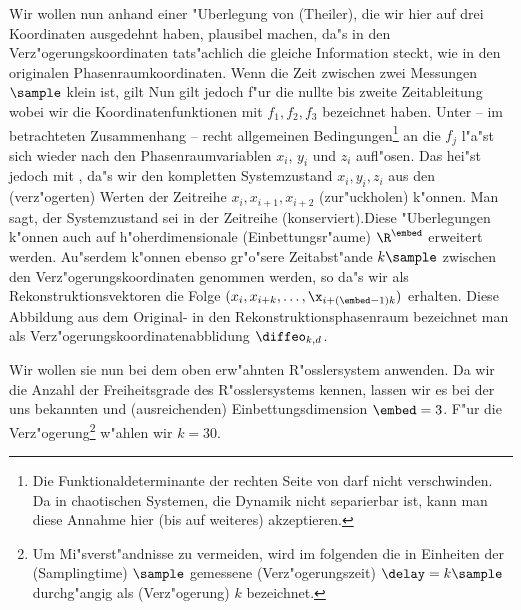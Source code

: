 Wir wollen nun anhand einer "Uberlegung von \autor(Theiler), die wir hier auf drei
Koordinaten ausgedehnt haben, plausibel machen, da"s in den Verz"ogerungskoordinaten
tats"achlich die gleiche Information steckt, wie in den originalen Phasenraumkoordinaten.
Wenn die Zeit zwischen zwei Messungen $\sample$ klein ist, gilt 
Nun gilt jedoch f"ur die nullte bis zweite Zeitableitung
wobei wir die Koordinatenfunktionen mit $f_1,f_2,f_3$ bezeichnet haben. Unter -- im
betrachteten Zusammenhang -- recht allgemeinen Bedingungen\footnote{Die
Funktionaldeterminante der rechten Seite von  darf nicht verschwinden. Da
in chaotischen Systemen, die Dynamik nicht separierbar ist, kann man diese Annahme hier
(bis auf weiteres) akzeptieren.} an die $f_j$ l"a"st sich  wieder
nach den Phasenraumvariablen $x_i$, $y_i$ und $z_i$ aufl"osen. Das hei"st jedoch mit
, da"s wir den kompletten Systemzustand $x_i,y_i,z_i$ aus den
\begriff(verz"ogerten) Werten der Zeitreihe $x_{i},x_{i+1},x_{i+2}$
\metapher(zur"uckholen) k"onnen. Man sagt, der Systemzustand sei in der Zeitreihe
\metapher(konserviert).Diese  "Uberlegungen k"onnen auch auf h"oherdimensionale
\begriff(Einbettungsr"aume) $\R^\embed$  erweitert werden. Au"serdem k"onnen ebenso
gr"o"sere Zeitabst"ande $k\sample$ zwischen den Verz"ogerungskoordinaten genommen werden,
so da"s wir als Rekonstruktionsvektoren die Folge $(x_{i},
x_{i+k},\dots,\x_{i+(\embed-1)k})$ erhalten. Diese Abbildung aus dem Original- in 
den Rekonstruktionsphasenraum bezeichnet man als Verz"ogerungskoordinatenabblidung $\diffeo_{k,d}$.

Wir wollen sie nun bei dem oben erw"ahnten R"osslersystem anwenden.
Da wir die Anzahl der Freiheitsgrade des R"osslersystems kennen, lassen wir es bei der uns
bekannten und \naja(ausreichenden) Einbettungsdimension $\embed=3$. F"ur die Verz"ogerung\footnote{Um Mi"sverst"andnisse
zu vermeiden, wird im folgenden die in Einheiten der \begriff(Samplingtime) $\sample$ gemessene 
\begriff(Verz"ogerungszeit) $\delay=k\sample$ durchg"angig als \begriff(Verz"ogerung) $k$
bezeichnet.} w"ahlen wir $k=30$. 

